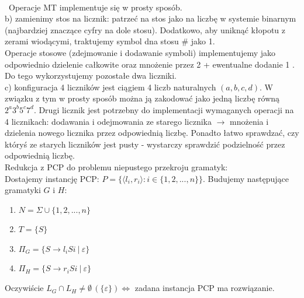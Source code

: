 \documentclass[a4paper,11pt]{article}
\newenvironment{zadanie}[1]
  {\renewcommand\theinnercustomthm{#1}\innercustomthm}
  {\endinnercustomthm}
\begin{document}
\\\
Operacje MT implementuje się w prosty sposób. \\
b) zamienimy stos na licznik: patrzeć na stos jako na liczbę w systemie binarnym (najbardziej
znaczące cyfry na dole stosu). Dodatkowo, aby uniknąć kłopotu z zerami wiodącymi, traktujemy symbol dna stosu $\#$ jako 1.\\
Operacje stosowe (zdejmowanie i dodawanie symboli) implementujemy jako odpowiednio 
dzielenie całkowite oraz mnożenie przez 2 + ewentualne dodanie 1 . Do tego wykorzystujemy pozostałe dwa liczniki. \\
c) konfiguracja 4 liczników jest ciągiem 4 liczb naturalnych $(a,b,c,d)$. W związku z tym w prosty sposób można ją zakodować
jako jedną liczbę równą $2^a3^b5^c7^d$. Drugi licznik jest potrzebny do implementacji wymaganych operacji na 4 licznikach:
dodawania i odejmowania ze starego licznika $\longrightarrow$ mnożenia i dzielenia nowego licznika przez odpowiednią liczbę. 
Ponadto łatwo sprawdzać, czy któryś ze starych liczników jest pusty - wystarczy sprawdzić podzielność przez odpowiednią liczbę. \\ 


\begin{zadanie}{114}
\end{zadanie}
Redukcja z PCP do problemu niepustego przekroju gramatyk: \\
Dostajemy instancję PCP: $P = \{ \langle l_i, r_i \rangle : i \in \{ 1,2,...,n \} \}$. Budujemy następujące gramatyki $G$ i $H$: \\
\begin{enumerate}
 \item $N = \Sigma \cup \{1,2,...,n\}$
 \item $T = \{ S \}$
 \item $\Pi_G = \{ S \longrightarrow l_i S i \ | \ \varepsilon \}$
 \item $\Pi_H = \{ S \longrightarrow r_i S i \ | \ \varepsilon \}$
\end{enumerate}
Oczywiście $L_G \cap L_H \neq \emptyset \, (\{ \varepsilon \}) \Longleftrightarrow $ zadana instancja PCP ma rozwiązanie.
\end{document}
